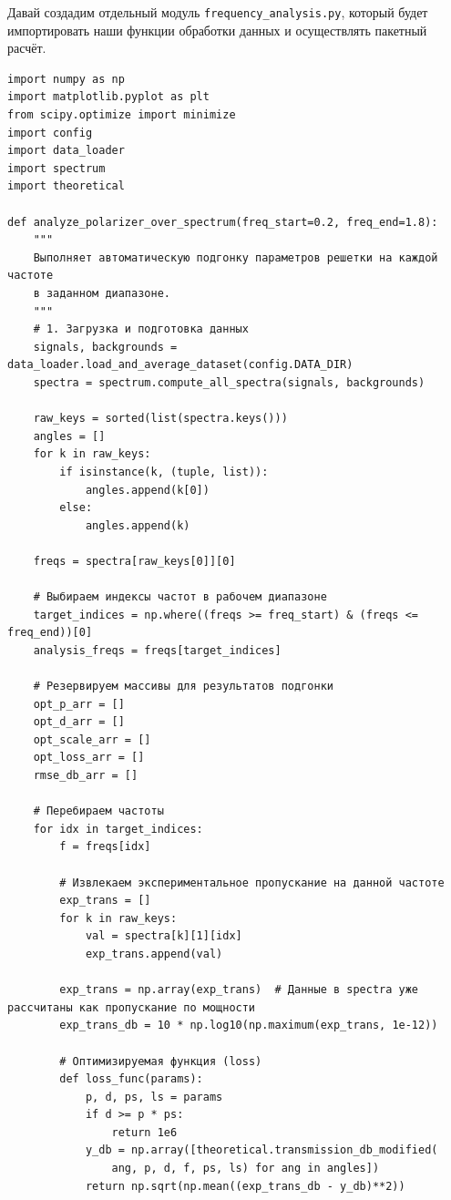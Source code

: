 Давай создадим отдельный модуль \texttt{frequency\_analysis.py}, который будет импортировать наши функции обработки данных и осуществлять пакетный расчёт.

\begin{verbatim}
import numpy as np
import matplotlib.pyplot as plt
from scipy.optimize import minimize
import config
import data_loader
import spectrum
import theoretical

def analyze_polarizer_over_spectrum(freq_start=0.2, freq_end=1.8):
    """
    Выполняет автоматическую подгонку параметров решетки на каждой частоте
    в заданном диапазоне.
    """
    # 1. Загрузка и подготовка данных
    signals, backgrounds = data_loader.load_and_average_dataset(config.DATA_DIR)
    spectra = spectrum.compute_all_spectra(signals, backgrounds)
    
    raw_keys = sorted(list(spectra.keys()))
    angles = []
    for k in raw_keys:
        if isinstance(k, (tuple, list)):
            angles.append(k[0])
        else:
            angles.append(k)
            
    freqs = spectra[raw_keys[0]][0]
    
    # Выбираем индексы частот в рабочем диапазоне
    target_indices = np.where((freqs >= freq_start) & (freqs <= freq_end))[0]
    analysis_freqs = freqs[target_indices]
    
    # Резервируем массивы для результатов подгонки
    opt_p_arr = []
    opt_d_arr = []
    opt_scale_arr = []
    opt_loss_arr = []
    rmse_db_arr = []
    
    # Перебираем частоты
    for idx in target_indices:
        f = freqs[idx]
        
        # Извлекаем экспериментальное пропускание на данной частоте
        exp_trans = []
        for k in raw_keys:
            val = spectra[k][1][idx]
            exp_trans.append(val)
            
        exp_trans = np.array(exp_trans)  # Данные в spectra уже рассчитаны как пропускание по мощности
        exp_trans_db = 10 * np.log10(np.maximum(exp_trans, 1e-12))
        
        # Оптимизируемая функция (loss)
        def loss_func(params):
            p, d, ps, ls = params
            if d >= p * ps:
                return 1e6
            y_db = np.array([theoretical.transmission_db_modified(
                ang, p, d, f, ps, ls) for ang in angles])
            return np.sqrt(np.mean((exp_trans_db - y_db)**2))
        

\end{verbatim}
